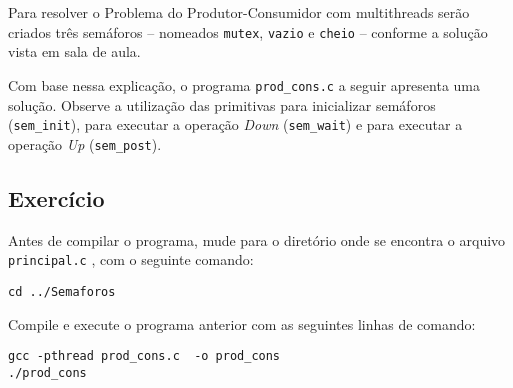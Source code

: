 Para resolver o Problema do Produtor-Consumidor com multithreads serão criados três semáforos -- nomeados \texttt{mutex}, \texttt{vazio} e \texttt{cheio} -- conforme a solução vista em sala de aula.

Com base nessa explicação, o programa \texttt{prod\_cons.c} a seguir apresenta uma solução. Observe a utilização das primitivas para inicializar semáforos (\texttt{sem\_init}), para executar a operação \textit{Down} (\texttt{sem\_wait}) e para executar a operação \textit{Up} (\texttt{sem\_post}).

\clearpage %



\subsection{Exercício}
Antes de compilar o programa, mude para o diretório onde se encontra o arquivo \texttt{principal.c} , com o seguinte comando:

\begin{lstlisting}[style=MyBashStyle]
cd ../Semaforos
\end{lstlisting}

Compile e execute o programa anterior com as seguintes linhas de comando:

\begin{lstlisting}[style=MyBashStyle]
gcc -pthread prod_cons.c  -o prod_cons
./prod_cons
\end{lstlisting}